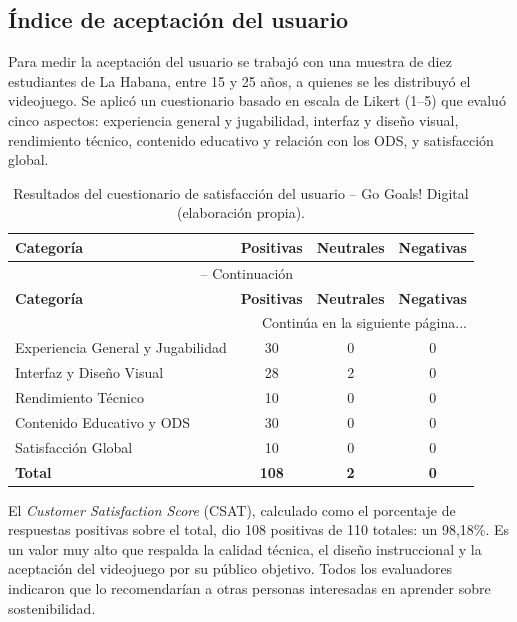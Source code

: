 \documentclass[12pt,a4paper]{article}
\begin{document}
\subsection{Índice de aceptación del usuario}

Para medir la aceptación del usuario se trabajó con una muestra de diez estudiantes de La Habana, entre 15 y 25 años, a quienes se les distribuyó el videojuego. Se aplicó un cuestionario basado en escala de Likert (1--5) que evaluó cinco aspectos: experiencia general y jugabilidad, interfaz y diseño visual, rendimiento técnico, contenido educativo y relación con los ODS, y satisfacción global.

\renewcommand{\arraystretch}{1.3}
\begin{longtable}{|p{}|c|c|c|}
\caption{Resultados del cuestionario de satisfacción del usuario -- Go Goals! Digital (elaboración propia).}
\label{tab:resultados_csat}\\
\hline
\textbf{Categoría} & \textbf{Positivas} & \textbf{Neutrales} & \textbf{Negativas} \\
\hline
\endfirsthead
\multicolumn{4}{c}{\tablename\ \thetable{} -- Continuación}\\
\hline
\textbf{Categoría} & \textbf{Positivas} & \textbf{Neutrales} & \textbf{Negativas} \\
\hline
\endhead
\hline
\multicolumn{4}{r}{\small Continúa en la siguiente página...}\\
\endfoot
\hline
\endlastfoot
Experiencia General y Jugabilidad & 30 & 0 & 0 \\
\hline
Interfaz y Diseño Visual & 28 & 2 & 0 \\
\hline
Rendimiento Técnico & 10 & 0 & 0 \\
\hline
Contenido Educativo y ODS & 30 & 0 & 0 \\
\hline
Satisfacción Global & 10 & 0 & 0 \\
\hline
\textbf{Total} & \textbf{108} & \textbf{2} & \textbf{0} \\
\hline
\end{longtable}

El \textit{Customer Satisfaction Score} (CSAT), calculado como el porcentaje de respuestas positivas sobre el total, dio 108 positivas de 110 totales: un 98,18\%. Es un valor muy alto que respalda la calidad técnica, el diseño instruccional y la aceptación del videojuego por su público objetivo. Todos los evaluadores indicaron que lo recomendarían a otras personas interesadas en aprender sobre sostenibilidad.
\end{document}
